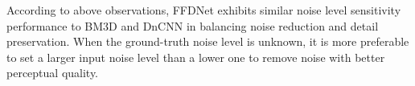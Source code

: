 \documentclass[journal]{IEEEtran}
\begin{document}
According to above observations, FFDNet exhibits similar noise level sensitivity performance to BM3D and DnCNN in balancing noise reduction and detail preservation. When the ground-truth noise level is unknown, it is more preferable to set a larger input noise level than a lower one to remove noise with better perceptual quality.


\begin{figure}[!htbp]
\begin{center}

\end{center}
\end{figure}
\end{document}
